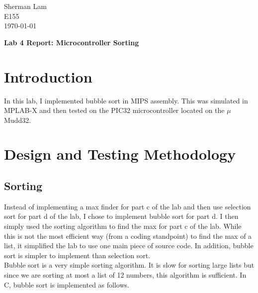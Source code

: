 \documentclass[11pt]{article}
\begin{document}
\begin{flushleft}
Sherman Lam
\\E155
\\ \today
\end{flushleft}


\begin{center}
\begin{Large}
\textbf{Lab 4 Report: Microcontroller Sorting}
\end{Large}
\end{center}




\section{Introduction}
\label{sec:intro}

In this lab, I implemented bubble sort in MIPS assembly. This was simulated in MPLAB-X and then tested on the PIC32 microcontroller located on the $\mu$Mudd32.



\section{Design and Testing Methodology}

\subsection{Sorting}

Instead of implementing a max finder for part c of the lab and then use selection sort for part d of the lab, I chose to implement bubble sort for part d. I then simply used the sorting algorithm to find the max for part c of the lab. While this is not the most efficient way (from a coding standpoint) to find the max of a list, it simplified the lab to use one main piece of source code. In addition, bubble sort is simpler to implement than selection sort. \\

Bubble sort is a very simple sorting algorithm. It is slow for sorting large lists but since we are sorting at most a list of 12 numbers, this algorithm is sufficient. In C, bubble sort is implemented as follows. \\
\end{document}
